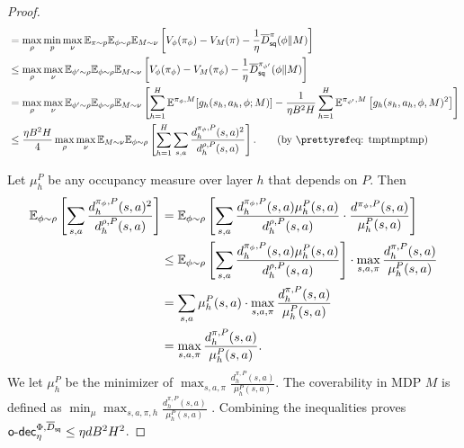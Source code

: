 \begin{proof}
\begin{align*}
        &=\max_\rho \min_p \max_\nu \E_{\pi\sim p}\E_{\phi\sim \rho} \E_{M\sim \nu} \left[V_\phi(\pi_\phi) - V_M(\pi) - \frac{1}{\eta} \tilD_\sbe^{\pi}(\phi\|M)\right]  \\ 
        &\leq \max_\rho \max_\nu \E_{\phi'\sim \rho}\E_{\phi\sim \rho} \E_{M\sim \nu} \left[V_\phi(\pi_\phi) - V_M(\pi_\phi) - \frac{1}{\eta} \tilD_\sbe^{\pi_{\phi'}}(\phi\|M)\right]  \\
        &=\max_\rho \max_\nu \E_{\phi'\sim \rho} \E_{\phi\sim \rho} \E_{M\sim \nu}\left[\sum_{h=1}^H \E^{\pi_\phi, M}[g_h(s_h,a_h, \phi; M)] - \frac{1}{\eta B^2H} \sum_{h=1}^H \E^{\pi_{\phi'}, M}\left[g_h(s_h,a_h, \phi, M)^2\right]\right] \\
        &\leq \frac{\eta B^2H}{4} \max_\rho \max_\nu \E_{M\sim \nu}\E_{\phi\sim \rho}  \left[\sum_{h=1}^H \sum_{s,a} \frac{d_h^{\pi_\phi, P}(s,a)^2}{d_h^{\rho, P}(s,a)}\right].  \tag{by \pref{eq: tmptmptmp}}
    \end{align*}

    
    Let $\mu_h^P$ be any occupancy measure over layer $h$ that depends on $P$. Then 
    \begin{align*}
        \mathbb{E}_{\phi\sim \rho}  \left[\sum_{s,a} \frac{d_h^{\pi_\phi, P}(s,a)^2}{d_h^{\rho, P}(s,a)}\right] 
        &= \mathbb{E}_{\phi\sim \rho}  \left[\sum_{s,a} \frac{d_h^{\pi_\phi, P}(s,a) \mu_h^P(s,a)}{d_h^{\rho, P}(s,a)}\cdot \frac{d^{\pi_\phi, P}(s,a)}{\mu_h^P(s,a)}\right] \\
        &\leq \mathbb{E}_{\phi\sim \rho}  \left[\sum_{s,a} \frac{d_h^{\pi_\phi, P}(s,a) \mu_h^P(s,a)}{d_h^{\rho, P}(s,a)} \right] \cdot\max_{s,a, \pi}\frac{d_h^{\pi, P}(s,a)}{\mu_h^P(s,a)} \\
        &= \sum_{s,a} \mu_h^P(s,a) \cdot \max_{s,a, \pi}\frac{d_h^{\pi, P}(s,a)}{\mu_h^P(s,a)} \\
        &= \max_{s,a, \pi}\frac{d_h^{\pi, P}(s,a)}{\mu_h^P(s,a)}. 
    \end{align*}
    We let $\mu_h^P$ be the minimizer of $\max_{s,a, \pi}\frac{d_h^{\pi, P}(s,a)}{\mu_h^P(s,a)}$. The coverability in MDP $M$ is defined as $\min_\mu \max_{s,a, \pi, h}\frac{d_h^{\pi, P}(s,a)}{\mu_h^P(s,a)}$ \citep{xie2022role}. Combining the inequalities proves $\mathsf{o}\text{-}\mathsf{dec}_\eta^{\Phi, \overline{D}_{\mathsf{sq}}}\leq \eta dB^2H^2$. 
\end{proof}


